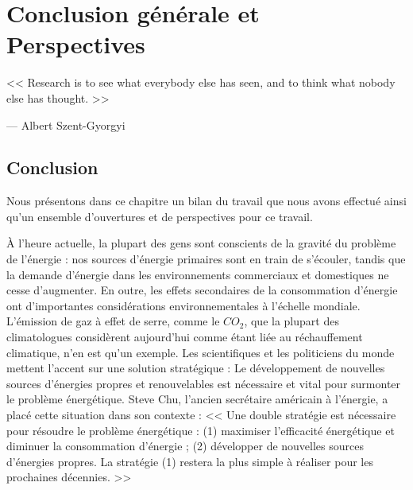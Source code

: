 \chapter{Conclusion générale et Perspectives}
\label{chap7}

\epigraph{<< Research is to see what everybody else has seen, and to think what nobody else has thought. >>}{--- \textup{Albert Szent-Gyorgyi}}

\NoChapterPrefix \NoChapterNumberInRef {\hypersetup{linkcolor=black} \minitoc}
 
\makeatletter
\renewcommand{\thefigure}{\ifnum \c@section>\z@ \thechapter.\fi
 \@arabic\c@figure}
\makeatother

\makeatletter
\renewcommand{\thetable}{\ifnum \c@section>\z@ \thechapter.\fi
 \@arabic\c@table}
\makeatother

\makeatletter
\renewcommand{\theequation}{\ifnum \c@section>\z@ \thechapter.\fi
 \@arabic\c@equation}
\makeatother
 
\newpage
 
\section{Conclusion}

Nous présentons dans ce chapitre un bilan du travail que nous avons effectué ainsi qu'un ensemble d'ouvertures et de perspectives pour ce travail.

À l'heure actuelle, la plupart des gens sont conscients de la gravité du problème de l'énergie : nos sources d'énergie primaires sont en train de s'écouler, tandis que la demande d'énergie dans les environnements commerciaux et domestiques ne cesse d'augmenter. En outre, les effets secondaires de la consommation d'énergie ont d'importantes considérations environnementales à l'échelle mondiale. L'émission de gaz à effet de serre, comme le $CO_2$, que la plupart des climatologues considèrent aujourd'hui comme étant liée au réchauffement climatique, n'en est qu'un exemple. Les scientifiques et les politiciens du monde mettent l'accent sur une solution stratégique : Le développement de nouvelles sources d'énergies propres et renouvelables est nécessaire et vital pour surmonter le problème énergétique. Steve Chu, l'ancien secrétaire américain à l'énergie, a placé cette situation dans son contexte \cite{Chu08} : << Une double stratégie est nécessaire pour résoudre le problème énergétique : (1) maximiser l'efficacité énergétique et diminuer la consommation d'énergie ; (2) développer de nouvelles sources d'énergies propres. La stratégie (1) restera la plus simple à réaliser pour les prochaines décennies. >>


